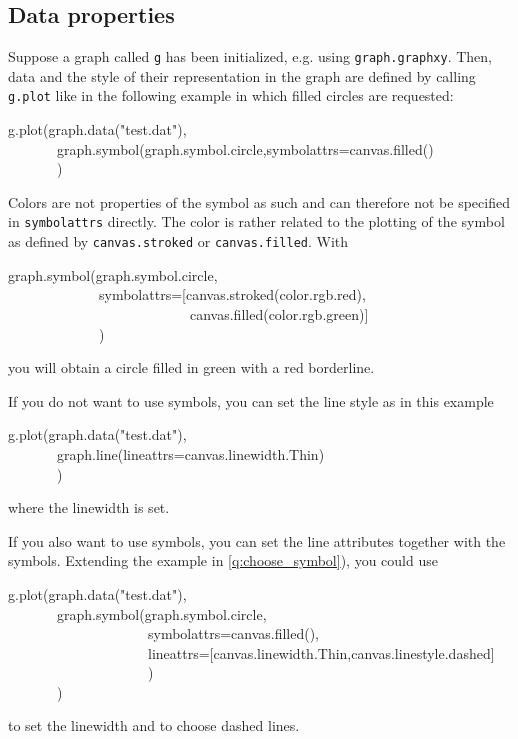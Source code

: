 \documentclass[11pt,DIV14]{scrartcl}
\begin{document}
\subsection{Data properties}

{}
{\label{q:choose_symbol}
Suppose a graph called \texttt{g} has been initialized, e.g. using
\texttt{graph.graphxy}. Then, data and the style of their representation
in the graph are defined by calling \texttt{g.plot} like in the following
example in which filled circles are requested:
\begin{progcode}
g.plot(graph.data("test.dat"),\\
~~~~~~~graph.symbol(graph.symbol.circle,symbolattrs=canvas.filled()\\
~~~~~~~)
\end{progcode}
}

{}
{Colors are not properties of the symbol as such and can therefore not
be specified in \texttt{symbolattrs} directly. The color is rather related
to the plotting of the symbol as defined by \texttt{canvas.stroked} or
\texttt{canvas.filled}. With
\begin{progcode}
graph.symbol(graph.symbol.circle,\\
~~~~~~~~~~~~~symbolattrs=[canvas.stroked(color.rgb.red),\\
~~~~~~~~~~~~~~~~~~~~~~~~~~canvas.filled(color.rgb.green)]\\
~~~~~~~~~~~~~)
\end{progcode}
you will obtain a circle filled in green with a red borderline.
}

{}
{If you do not want to use symbols, you can set the line style as in this
example
\begin{progcode}
g.plot(graph.data("test.dat"),\\
~~~~~~~graph.line(lineattrs=canvas.linewidth.Thin)\\
~~~~~~~)
\end{progcode}
where the linewidth is set.

If you also want to use symbols, you can set the line attributes together
with the symbols.  Extending the example in \ref{q:choose_symbol}),
you could use
\begin{progcode}
g.plot(graph.data("test.dat"),\\
~~~~~~~graph.symbol(graph.symbol.circle, \\
~~~~~~~~~~~~~~~~~~~~symbolattrs=canvas.filled(),\\
~~~~~~~~~~~~~~~~~~~~lineattrs=[canvas.linewidth.Thin,canvas.linestyle.dashed]\\
~~~~~~~~~~~~~~~~~~~~)\\
~~~~~~~)
\end{progcode}
to set the linewidth and to choose dashed lines. 
}
\end{document}
